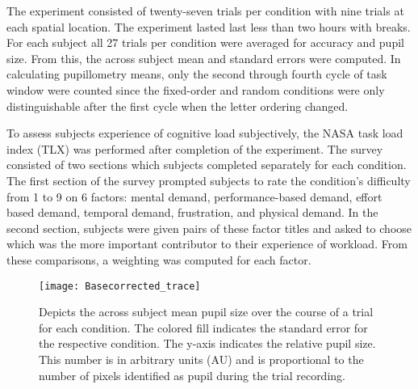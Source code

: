 \documentclass[10pt]{article}
\begin{document}
The experiment consisted of twenty-seven trials per condition
with nine trials at each spatial location.  The experiment
lasted last less than two hours with breaks.   For each
subject all 27 trials per condition were averaged for accuracy
and pupil size.  From this, the across subject mean and
standard errors were computed.  
In calculating pupillometry means, only the second through
fourth cycle of task window were counted since the fixed-order
and random conditions were only distinguishable after the
first cycle when the letter ordering changed.

To assess subjects experience of cognitive load subjectively,
the NASA task load index (TLX) was performed after completion
of the experiment\cite{kubler}.  The survey consisted of two
sections which subjects completed separately for each
condition.  The first section of the survey prompted subjects
to rate the condition's difficulty from 1 to 9 on 6 factors:
mental demand, performance-based demand, effort based demand,
temporal demand, frustration, and physical demand. In the
second section, subjects were given pairs of these factor
titles and asked to choose which was the more important
contributor to their experience of workload.  From these
comparisons, a weighting was computed for each factor.  





\begin{figure}[t]
  \centering
  \texttt{[image: Basecorrected\_trace]}
  \caption{Depicts the across subject mean pupil size over the course of a trial
  for each condition.  The colored fill indicates the standard error
  for the respective condition.  The y-axis indicates the
  relative pupil size.  This number is in arbitrary units (AU) and
  is proportional to the number of pixels identified as pupil during
  the trial recording.}
  \label{trialtrace}
\end{figure}
\end{document}
